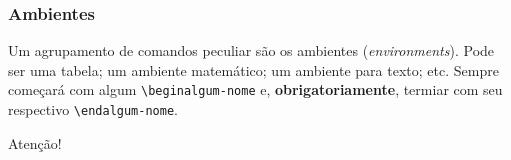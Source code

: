 % 
  \subsubsection{Ambientes}
% 

Um agrupamento de comandos peculiar são os \textsf{ambientes} (\textit{environments}). 
Pode ser uma tabela; um ambiente matemático; um ambiente para texto; etc. 
Sempre começará com algum \texttt{\textbackslash begin{algum-nome}} e, 
\textbf{obrigatoriamente}, termiar com seu respectivo \texttt{\textbackslash end{algum-nome}}. 

\begin{atencao}{Atenção!}{\exclamacao}
\end{atencao}




